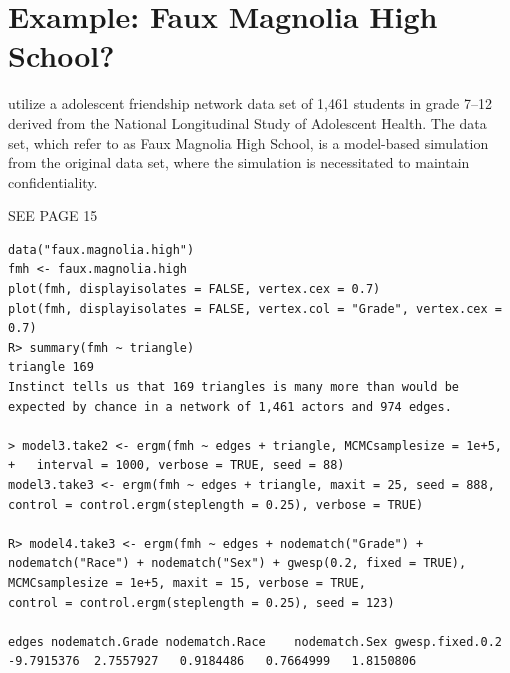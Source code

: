 \section{Example: Faux Magnolia High School?}
\citet{advancesp*,statnet-tutorial} utilize a adolescent friendship network data set 
of 1,461 students in grade 7--12 derived from the National Longitudinal Study of 
Adolescent Health.  The data set, which \citeauthor{statnet-tutorial} refer to as Faux 
Magnolia High School, is a model-based simulation from the original data set, where 
the simulation is necessitated to maintain confidentiality.

SEE PAGE 15
\begin{verbatim}
data("faux.magnolia.high")
fmh <- faux.magnolia.high
plot(fmh, displayisolates = FALSE, vertex.cex = 0.7)
plot(fmh, displayisolates = FALSE, vertex.col = "Grade", vertex.cex = 0.7)
R> summary(fmh ~ triangle)
triangle 169
Instinct tells us that 169 triangles is many more than would be expected by chance in a network of 1,461 actors and 974 edges. 

> model3.take2 <- ergm(fmh ~ edges + triangle, MCMCsamplesize = 1e+5, 
+	interval = 1000, verbose = TRUE, seed = 88)
model3.take3 <- ergm(fmh ~ edges + triangle, maxit = 25, seed = 888,	
control = control.ergm(steplength = 0.25), verbose = TRUE)

R> model4.take3 <- ergm(fmh ~ edges + nodematch("Grade") +
nodematch("Race") + nodematch("Sex") + gwesp(0.2, fixed = TRUE), 
MCMCsamplesize = 1e+5, maxit = 15, verbose = TRUE, 
control = control.ergm(steplength = 0.25), seed = 123)

edges nodematch.Grade nodematch.Race	nodematch.Sex gwesp.fixed.0.2 
-9.7915376	2.7557927	0.9184486	0.7664999	1.8150806
\end{verbatim}


